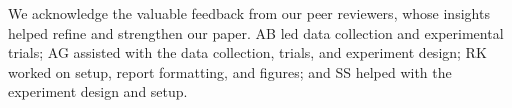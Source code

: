 \documentclass[reprint,amsmath,amssymb,aps,twoside]{revtex4-2}
\begin{document}
We acknowledge the valuable feedback from our peer reviewers, whose insights helped refine and strengthen our paper. AB led data collection and experimental trials; AG assisted with the data collection, trials, and experiment design; RK worked on setup, report formatting, and figures; and SS helped with the experiment design and setup. 
    

\end{document}
